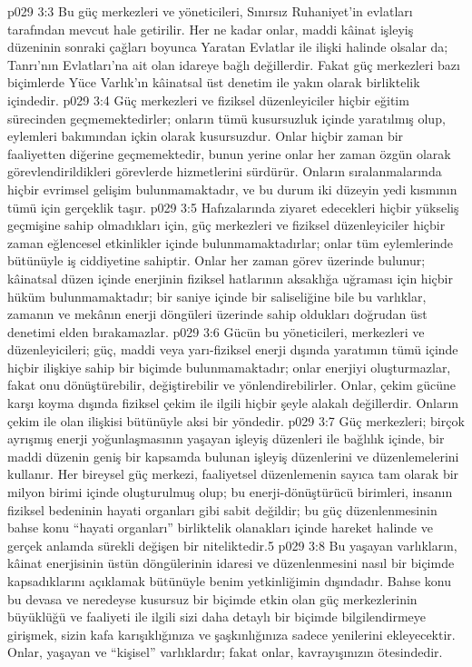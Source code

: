 \vs p029 3:3 Bu güç merkezleri ve yöneticileri, Sınırsız Ruhaniyet’in evlatları tarafından mevcut hale getirilir. Her ne kadar onlar, maddi kâinat işleyiş düzeninin sonraki çağları boyunca Yaratan Evlatlar ile ilişki halinde olsalar da; Tanrı’nın Evlatları’na ait olan idareye bağlı değillerdir. Fakat güç merkezleri bazı biçimlerde Yüce Varlık’ın kâinatsal üst denetim ile yakın olarak birliktelik içindedir.
\vs p029 3:4 Güç merkezleri ve fiziksel düzenleyiciler hiçbir eğitim sürecinden geçmemektedirler; onların tümü kusursuzluk içinde yaratılmış olup, eylemleri bakımından içkin olarak kusursuzdur. Onlar hiçbir zaman bir faaliyetten diğerine geçmemektedir, bunun yerine onlar her zaman özgün olarak görevlendirildikleri görevlerde hizmetlerini sürdürür. Onların sıralanmalarında hiçbir evrimsel gelişim bulunmamaktadır, ve bu durum iki düzeyin yedi kısmının tümü için gerçeklik taşır.
\vs p029 3:5 Hafızalarında ziyaret edecekleri hiçbir yükseliş geçmişine sahip olmadıkları için, güç merkezleri ve fiziksel düzenleyiciler hiçbir zaman eğlencesel etkinlikler içinde bulunmamaktadırlar; onlar tüm eylemlerinde bütünüyle iş ciddiyetine sahiptir. Onlar her zaman görev üzerinde bulunur; kâinatsal düzen içinde enerjinin fiziksel hatlarının aksaklığa uğraması için hiçbir hüküm bulunmamaktadır; bir saniye içinde bir saliseliğine bile bu varlıklar, zamanın ve mekânın enerji döngüleri üzerinde sahip oldukları doğrudan üst denetimi elden bırakamazlar.
\vs p029 3:6 Gücün bu yöneticileri, merkezleri ve düzenleyicileri; güç, maddi veya yarı\hyp{}fiziksel enerji dışında yaratımın tümü içinde hiçbir ilişkiye sahip bir biçimde bulunmamaktadır; onlar enerjiyi oluşturmazlar, fakat onu dönüştürebilir, değiştirebilir ve yönlendirebilirler. Onlar, çekim gücüne karşı koyma dışında fiziksel çekim ile ilgili hiçbir şeyle alakalı değillerdir. Onların çekim ile olan ilişkisi bütünüyle aksi bir yöndedir.
\vs p029 3:7 Güç merkezleri; birçok ayrışmış enerji yoğunlaşmasının yaşayan işleyiş düzenleri ile bağlılık içinde, bir maddi düzenin geniş bir kapsamda bulunan işleyiş düzenlerini ve düzenlemelerini kullanır. Her bireysel güç merkezi, faaliyetsel düzenlemenin sayıca tam olarak bir milyon birimi içinde oluşturulmuş olup; bu enerji\hyp{}dönüştürücü birimleri, insanın fiziksel bedeninin hayati organları gibi sabit değildir; bu güç düzenlenmesinin bahse konu “hayati organları” birliktelik olanakları içinde hareket halinde ve gerçek anlamda sürekli değişen bir niteliktedir.5
\vs p029 3:8 Bu yaşayan varlıkların, kâinat enerjisinin üstün döngülerinin idaresi ve düzenlenmesini nasıl bir biçimde kapsadıklarını açıklamak bütünüyle benim yetkinliğimin dışındadır. Bahse konu bu devasa ve neredeyse kusursuz bir biçimde etkin olan güç merkezlerinin büyüklüğü ve faaliyeti ile ilgili sizi daha detaylı bir biçimde bilgilendirmeye girişmek, sizin kafa karışıklığınıza ve şaşkınlığınıza sadece yenilerini ekleyecektir. Onlar, yaşayan ve “kişisel” varlıklardır; fakat onlar, kavrayışınızın ötesindedir.
